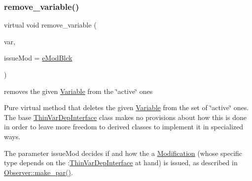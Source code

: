 \mbox{\label{group___thin_var_dep_interface___c_l_a_s_s_e_s_gad6726141a0cbe6a0410a2b396809dade}} 
\subsubsection{\texorpdfstring{remove\+\_\+variable()}{remove\_variable()}}
{\footnotesize\ttfamily virtual void remove\+\_\+variable (\begin{DoxyParamCaption}\item[{\mbox{\hyperlink{class_s_m_spp__di__unipi__it_1_1_variable}{Variable}} $\ast$}]{var,  }\item[{\mbox{\hyperlink{group___modification___t_y_p_e_s_ga544246d8c462e9a2d817c2c30797968f}{c\+\_\+\+Mod\+Param}}}]{issue\+Mod = {\ttfamily \mbox{\hyperlink{group___modification___t_y_p_e_s_gga48fddcdd03a03f49b7e389ca1ed938d4a21b14b26b1c0093a0905f6fc010bad29}{e\+Mod\+Blck}}} }\end{DoxyParamCaption})\hspace{0.3cm}{\ttfamily [pure virtual]}}



removes the given \mbox{\hyperlink{class_s_m_spp__di__unipi__it_1_1_variable}{Variable}} from the \char`\"{}active\char`\"{} ones 

Pure virtual method that deletes the given \mbox{\hyperlink{class_s_m_spp__di__unipi__it_1_1_variable}{Variable}} from the set of \char`\"{}active\char`\"{} ones. The base \mbox{\hyperlink{class_s_m_spp__di__unipi__it_1_1_thin_var_dep_interface}{Thin\+Var\+Dep\+Interface}} class makes no provisions about how this is done in order to leave more freedom to derived classes to implement it in specialized ways.

The parameter issue\+Mod decides if and how the a \mbox{\hyperlink{class_s_m_spp__di__unipi__it_1_1_modification}{Modification}} (whose specific type depends on the \+:\mbox{\hyperlink{class_s_m_spp__di__unipi__it_1_1_thin_var_dep_interface}{Thin\+Var\+Dep\+Interface}} at hand) is issued, as described in \mbox{\hyperlink{class_s_m_spp__di__unipi__it_1_1_observer_a2d499ae38e5e95cf66cd71da32b0694a}{Observer\+::make\+\_\+par()}}.


